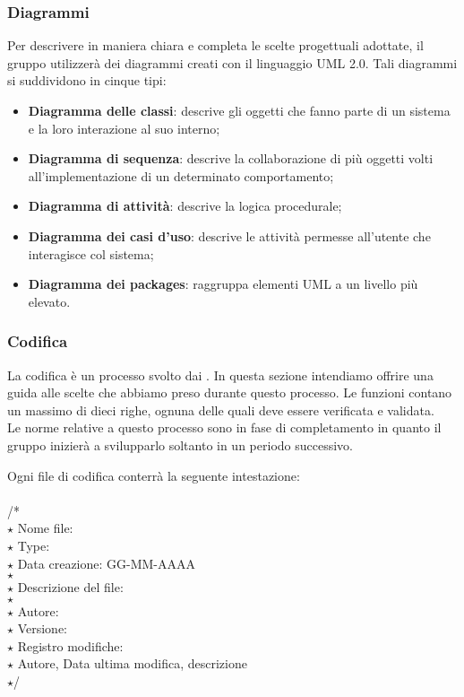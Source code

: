 \subsubsection{Diagrammi}
Per descrivere in maniera chiara e completa le scelte progettuali adottate, il gruppo utilizzerà dei diagrammi
creati con il linguaggio UML 2.0. Tali diagrammi si suddividono in cinque tipi:
\begin{itemize}
    \item \textbf{Diagramma delle classi}: descrive gli oggetti che fanno parte di un sistema e la loro interazione al suo interno;
    \item \textbf{Diagramma di sequenza}: descrive la collaborazione di più oggetti volti all'implementazione di un determinato comportamento;
    \item \textbf{Diagramma di attività}: descrive la logica procedurale;
    \item \textbf{Diagramma dei casi d'uso}: descrive le attività permesse all'utente che interagisce col sistema;
    \item \textbf{Diagramma dei packages}: raggruppa elementi UML a un livello più elevato.
\end{itemize} 

\subsubsection{Codifica}
La codifica è un processo svolto dai \roleProgrammerP{}. In questa sezione intendiamo offrire una guida alle scelte
che abbiamo preso durante questo processo. Le funzioni contano un massimo di dieci righe, ognuna
delle quali deve essere verificata e validata. \\
Le norme relative a questo processo sono in fase di completamento in quanto il gruppo inizierà a svilupparlo
soltanto in un periodo successivo.

Ogni file di codifica conterrà la seguente intestazione:\\ \\
/*\\
$\star$ Nome file:\\
$\star$ Type:\\
$\star$ Data creazione: GG-MM-AAAA\\
$\star$\\
$\star$ Descrizione del file:\\
$\star$\\
$\star$ Autore:\\
$\star$ Versione:\\
$\star$ Registro modifiche:\\
$\star$ Autore, Data ultima modifica, descrizione\\
$\star$/\\

